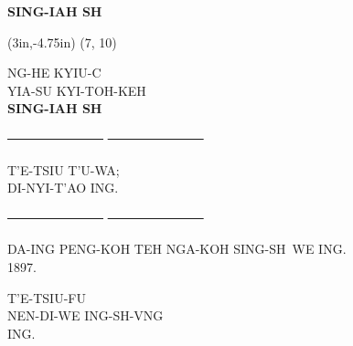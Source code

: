 \begin{titlepage}
	\vspace*{18ex}
	\begin{center}
		{\huge\bfseries\MakeUppercase{Sing-Iah Sh\y}}
	\end{center}
	
	\clearpage
	
	\thisfancyput(3in,-4.75in){
		\setlength{\unitlength}{1in}
		\oval(7, 10)
	}
	
	\begin{center}
		\MakeUppercase{
			{\Large ng\oo-he kyiu-c\y}			\\[6.5ex]
			{\LARGE yia-su kyi-toh-keh}			\\[7.5ex]
			{\huge\bfseries Sing-Iah Sh\y}		\\
		}
		
		\vfill
		{\Large \sout{~~~~~~~~~~~~~~~}  \sout{~~~~~~~~~~~~~~~}}
		\vfill
		
		\MakeUppercase{
			{\LARGE t'e-tsiu t'u-wa;}			\\[6ex]
			{\large di-nyi-t'ao ing.}			\\
		}
		
		\vfill
		{\Large \sout{~~~~~~~~~~~~~~~}  \sout{~~~~~~~~~~~~~~~}}
		\vfill
		
		\MakeUppercase{
			{\large da-ing peng-koh teh nga-koh sing-sh\y\ we ing. \\[2ex]
					1897.
			}	
		}
	\end{center}
	
	\clearpage
	
	\vspace*{\fill}
	\begin{center}
		\MakeUppercase{
			t'e-tsiu-fu \\
			nen-di-we ing-sh\y-v\oo ng \\
			ing.
		}
	\end{center}
	\vspace*{\fill}
	
\end{titlepage}